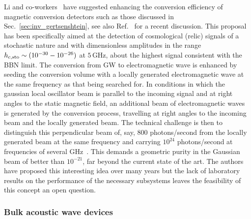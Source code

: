 \documentclass[11pt,a4paper]{article}
\begin{document}
Li and co-workers~\cite{Li:2004df, Li:2006sx, Baker:2008zzb, Li} have suggested enhancing the conversion efficiency of magnetic conversion detectors such as those discussed in Sec.~\ref{sec:inv_gertsenshtein}, {see also Ref.~\cite{Ringwald:2020ist} for a recent discussion}. This proposal has been specifically aimed at the detection of cosmological (relic) signals of a stochastic nature and with dimensionless amplitudes in the range $h_{c,\rm sto} \sim (10^{-30} - 10^{-26})$ at $5 \, \text{GHz}$, about the highest signal consistent with the BBN limit. The conversion from GW to electromagnetic wave is enhanced by seeding the conversion volume with a locally generated electromagnetic wave at the same frequency as that being searched for. In conditions in which the gaussian local oscillator beam is parallel to the incoming signal and at right angles to the static magnetic field, an additional beam of electromagnetic waves is generated by the conversion process, travelling at right angles to the incoming beam and the locally generated beam. The technical challenge is then to distinguish this perpendicular beam of, say, 800 photons/second from the locally generated beam at the same frequency and carrying $10^{24}$ photons/second at frequencies of several GHz~\cite{WOODS201266}. This demands a geometric purity in the Gaussian beam of better than $10^{-21}$, far beyond the current state of the art. The authors have proposed this interesting idea over many years but the lack of laboratory results on the performance of the necessary subsystems leaves the feasibility of this concept an open question.

\subsubsection{Bulk acoustic wave devices}
\label{sec:BAW}
\end{document}
